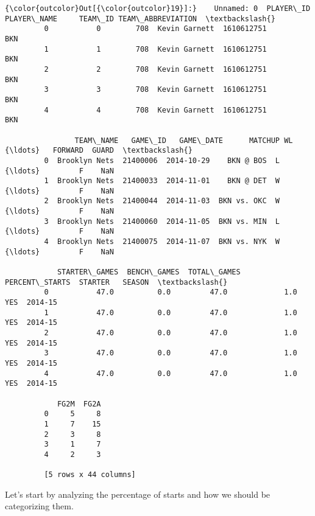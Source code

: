 \documentclass[11pt]{article}
\begin{document}
\begin{Verbatim}[commandchars=\\\{\}]
{\color{outcolor}Out[{\color{outcolor}19}]:}    Unnamed: 0  PLAYER\_ID    PLAYER\_NAME     TEAM\_ID TEAM\_ABBREVIATION  \textbackslash{}
         0           0        708  Kevin Garnett  1610612751               BKN   
         1           1        708  Kevin Garnett  1610612751               BKN   
         2           2        708  Kevin Garnett  1610612751               BKN   
         3           3        708  Kevin Garnett  1610612751               BKN   
         4           4        708  Kevin Garnett  1610612751               BKN   
         
                TEAM\_NAME   GAME\_ID   GAME\_DATE      MATCHUP WL  {\ldots}   FORWARD  GUARD  \textbackslash{}
         0  Brooklyn Nets  21400006  2014-10-29    BKN @ BOS  L  {\ldots}         F    NaN   
         1  Brooklyn Nets  21400033  2014-11-01    BKN @ DET  W  {\ldots}         F    NaN   
         2  Brooklyn Nets  21400044  2014-11-03  BKN vs. OKC  W  {\ldots}         F    NaN   
         3  Brooklyn Nets  21400060  2014-11-05  BKN vs. MIN  L  {\ldots}         F    NaN   
         4  Brooklyn Nets  21400075  2014-11-07  BKN vs. NYK  W  {\ldots}         F    NaN   
         
            STARTER\_GAMES  BENCH\_GAMES  TOTAL\_GAMES  PERCENT\_STARTS  STARTER   SEASON  \textbackslash{}
         0           47.0          0.0         47.0             1.0      YES  2014-15   
         1           47.0          0.0         47.0             1.0      YES  2014-15   
         2           47.0          0.0         47.0             1.0      YES  2014-15   
         3           47.0          0.0         47.0             1.0      YES  2014-15   
         4           47.0          0.0         47.0             1.0      YES  2014-15   
         
            FG2M  FG2A  
         0     5     8  
         1     7    15  
         2     3     8  
         3     1     7  
         4     2     3  
         
         [5 rows x 44 columns]
\end{Verbatim}
            
    Let's start by analyzing the percentage of starts and how we should be
categorizing them.
\end{document}
